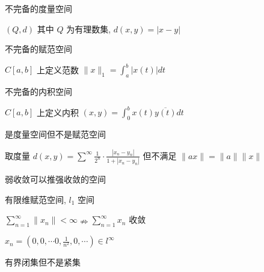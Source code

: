 \documentclass[10pt, twocolumn]{yerbaformat}
\begin{document}
\footnotesize


\begin{example}
    不完备的度量空间
\end{example}

$(Q, d)$ 其中 $Q$ 为有理数集, $d(x, y)=|x-y|$

\begin{example}
    不完备的赋范空间
\end{example}

$C[a, b]$ 上定义范数 $\|x \|_{1}=\int_{a}^{b}|x(t)| d t$

\begin{example}
    不完备的内积空间
\end{example}

$C[a, b]$ 上定义内积 $(x, y)=\int_{0}^{b} x(t) \overline{y(t)} dt$

\begin{example}
    是度量空间但不是赋范空间
\end{example}

取度量 $d(x, y)=\sum^{\infty} \frac{1}{2^{n}} \cdot \frac{\left|x_{n}-y_{n}\right|}{1+\left|x_{n}-y_{n}\right|}$ 但不满足 $\|a x\|=\|a\|\|x\|$

\begin{example}
    弱收敛可以推强收敛的空间
\end{example}
    
有限维赋范空间, $l_{1}$ 空间

\begin{example}
    $\sum_{n=1}^{\infty} \| x_{n} \|<\infty \nRightarrow \sum_{n=1}^{\infty} x_{n}$ 收敛
\end{example}

$x_{n}=\left(0,0, \cdots 0, \frac{1}{n^{2}}, 0, \cdots\right) \in l^{\infty}$

\begin{example}
    有界闭集但不是紧集
\end{example}
\end{document}
